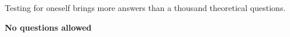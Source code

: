\thispagestyle{empty} 
\begin{center}

  \vfill

  \vspace{5cm}

  {\huge Testing for oneself brings more answers than a thousand 
  theoretical questions.}

  \vfill

  {\Large \textcolor{red!50!black}{\textbf{No questions allowed}}}
\end{center}

\clearpage
